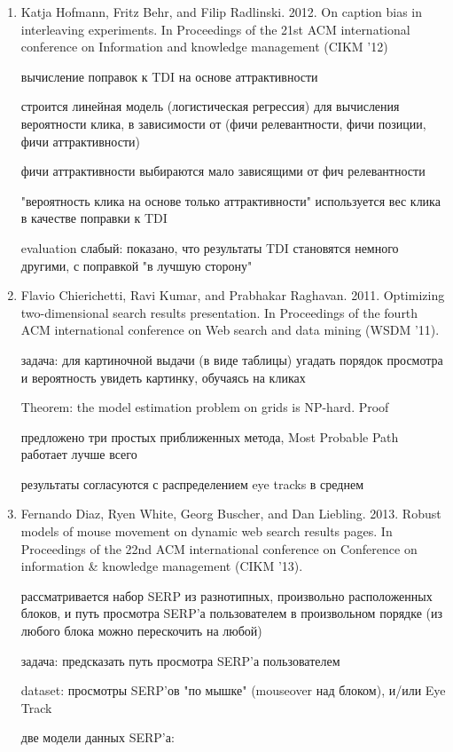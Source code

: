 \documentclass[12pt,a4paper]{article}
\begin{document}
\begin{enumerate}
\item Katja Hofmann, Fritz Behr, and Filip Radlinski. 2012. On caption bias in interleaving experiments. In Proceedings of the 21st ACM international conference on Information and knowledge management (CIKM '12)

  вычисление поправок к TDI на основе аттрактивности

  строится линейная модель (логистическая регрессия) для вычисления вероятности клика, в зависимости от
  (фичи релевантности, фичи позиции, фичи аттрактивности)

  фичи аттрактивности выбираются мало зависящими от фич релевантности

  "вероятность клика на основе только аттрактивности" используется вес клика в качестве поправки к TDI

  evaluation слабый: показано, что результаты TDI становятся немного другими, с поправкой "в лучшую сторону"

\item Flavio Chierichetti, Ravi Kumar, and Prabhakar Raghavan. 2011. Optimizing two-dimensional search results presentation. In Proceedings of the fourth ACM international conference on Web search and data mining (WSDM '11).

  задача: для картиночной выдачи (в виде таблицы) угадать порядок просмотра и вероятность увидеть картинку, обучаясь на кликах

  Theorem: the model estimation problem on grids is NP-hard. Proof

  предложено три простых приближенных метода, Most Probable Path работает лучше всего

  результаты согласуются с распределением eye tracks в среднем

\item Fernando Diaz, Ryen White, Georg Buscher, and Dan Liebling. 2013. Robust models of mouse movement on dynamic web search results pages. In Proceedings of the 22nd ACM international conference on Conference on information \& knowledge management (CIKM '13).

  рассматривается набор SERP из разнотипных, произвольно расположенных блоков,
  и путь просмотра SERP'а пользователем в произвольном порядке (из любого блока можно перескочить на любой)

  задача: предсказать путь просмотра SERP'а пользователем

  dataset: просмотры SERP'ов "по мышке" (mouseover над блоком), и/или Eye Track

  две модели данных SERP'а:


\end{enumerate}
\end{document}

